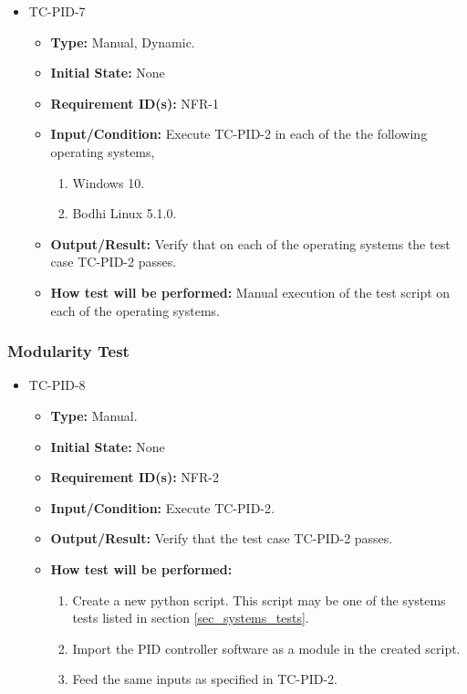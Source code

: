 \documentclass[12pt, titlepage]{article}
\begin{document}
\begin{itemize}
\item{TC-PID-7\\}
\begin{itemize}

\item{\textbf{Type:}} Manual, Dynamic.
					
\item{\textbf{Initial State:}} None

\item{\textbf{Requirement ID(s):}} NFR-1
					
\item{\textbf{Input/Condition:}}  Execute TC-PID-2 in each of the the following 
operating systems,

\begin{enumerate}
\item Windows 10.
\item Bodhi Linux 5.1.0. 
\end {enumerate}
					
\item{\textbf{Output/Result:}} Verify that on each of the operating systems the test 
case TC-PID-2 passes. 

\item{\textbf{How test will be performed:}}  Manual execution of the test script on 
each of the operating systems.

\end{itemize}
\end{itemize}

\subsubsection{Modularity Test}
\begin{itemize}
\item{TC-PID-8\\}
\begin{itemize}
\item{\textbf{Type:}} Manual.
					
\item{\textbf{Initial State:}} None

\item{\textbf{Requirement ID(s):}} NFR-2
					
\item{\textbf{Input/Condition:}}  Execute TC-PID-2.
					
\item{\textbf{Output/Result:}} Verify that the test case TC-PID-2 passes.

\item{\textbf{How test will be performed:}}  
\begin{enumerate}
\item Create a new python script. This script may be one of the 
systems tests listed in section \ref{sec_systems_tests}. 
\item Import the PID controller software as a module in the created script.
\item Feed the same inputs as specified in TC-PID-2.
\end{enumerate}
\end{itemize}
\end{itemize}
\end{document}
